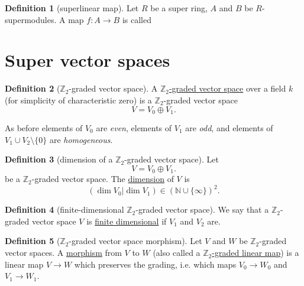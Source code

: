 \documentclass[a4paper,10pt]{scrreprt}
\newcommand{\Z}{\mathbb{Z}}
\newcommand{\N}{\mathbb{N}}
\newcommand{\defn}[1]{\ul{#1}}
\theoremstyle{definition}
\newtheorem{definition}{Definition}[section]
\theoremstyle{plain}
\theoremstyle{remark}
\begin{document}
\begin{definition}[superlinear map]
  \label{def:superlinear}
  Let $R$ be a super ring, $A$ and $B$ be $R$-supermodules. A map $f\colon A \to B$ is called 
\end{definition}

\section{Super vector spaces}
\begin{definition}[$\Z_{2}$-graded vector space]
  \label{def:z2gradedvectorspace}
  A \defn{$\Z_{2}$-graded vector space} over a field $k$ (for simplicity of characteristic zero) is a $\Z_{2}$-graded vector space
  \begin{equation*}
    V = V_{0} \oplus V_{1}.
  \end{equation*}
\end{definition}
As before elements of $V_{0}$ are \emph{even}, elements of $V_{1}$ are \emph{odd}, and elements of $V_{1} \cup V_{2} \setminus \{0\}$ are \emph{homogeneous}.

\begin{definition}[dimension of a $\Z_{2}$-graded vector space]
  \label{def:dimensionofaz2gradedvectorspace}
  Let 
  \begin{equation*}
    V = V_{0} \oplus V_{1}.
  \end{equation*}
  be a $\Z_{2}$-graded vector space. The \defn{dimension} of $V$ is
  \begin{equation*}
    (\dim V_{0}| \dim V_{1}) \in (\N \cup \{\infty\})^{2}.
  \end{equation*}
\end{definition} 

\begin{definition}[finite-dimensional $\Z_{2}$-graded vector space]
  \label{def:finitedimensionalz2gradedvectorspace}
  We say that a $\Z_{2}$-graded vector space $V$ is \defn{finite dimensional} if $V_{1}$ and $V_{2}$ are.
\end{definition}

\begin{definition}[$\Z_{2}$-graded vector space morphism]
  \label{def:z2gradedvectorspacemorphism}
  Let $V$ and $W$ be $\Z_{2}$-graded vector spaces. A \defn{morphism} from $V$ to $W$ (also called a \defn{$\Z_{2}$-graded linear map}) is a linear map $V \to W$ which preserves the grading, i.e. which maps $V_{0} \to W_{0}$ and $V_{1} \to W_{1}$.
\end{definition}
\end{document}
